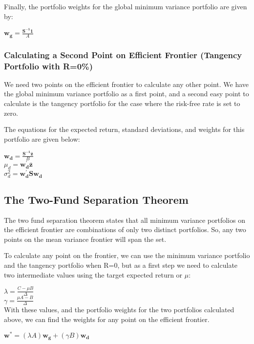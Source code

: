 \documentclass[12pt,a4paper]{article}
\begin{document}
Finally, the portfolio weights for the global minimum variance portfolio are given by:

$\mathbf{w_{g}}=\frac{\mathbf{S^{-1}1}}{A}$\\

\subsubsection{Calculating a Second Point on Efficient Frontier (Tangency Portfolio with R=0\%)}

We need two points on the efficient frontier to calculate any other point.  We have the global minimum variance portfolio as a first point, and a second easy point to calculate is the tangency portfolio for the case where the risk-free rate is set to zero.

The equations for the expected return, standard deviations, and weights for this portfolio are given below:

$\mathbf{w_{d}}=\frac{\mathbf{S^{-1}\bar{z}}}{B}$\\

$\mu_{d}=\mathbf{w_{d}^{'}\bar{z}}$\\

$\sigma_{d}^{2}=\mathbf{w_{d}^{'}Sw_d}$\\

\subsection{The Two-Fund Separation Theorem}

The two fund separation theorem states that all minimum variance portfolios on the efficient frontier  are combinations of only two distinct portfolios.  So, any two points on the mean variance frontier will span the set.

To calculate any point on the frontier, we can use the minimum variance portfolio and the tangency portfolio when R=0, but as a first step we need to calculate two intermediate values using the target expected return or $\mu$:

$\lambda=\frac{C-\mu B}{\Delta}$\\

$\gamma=\frac{\mu A-B}{\Delta}$\\

With these values, and the portfolio weights for the two portfolios calculated above, we can find the weights for any point on the efficient frontier.

$\mathbf{w^{*}}=\left ( \lambda A \right )\mathbf{w_{g}} + \left (\gamma B \right )\mathbf{w_d}$\\
\end{document}
